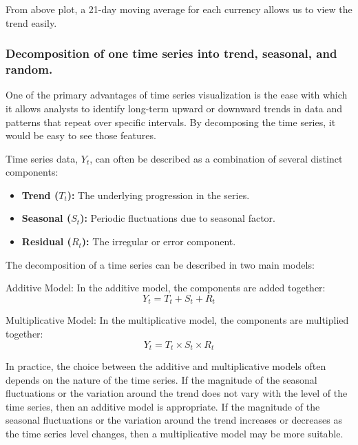 \documentclass{article}\usepackage[]{graphicx}\usepackage[]{xcolor}
\begin{document}
From above plot, a 21-day moving average for each currency allows us to view the trend easily.

\subsubsection{Decomposition of one time series into trend, seasonal, and random.}

One of the primary advantages of time series visualization is the ease with which it allows analysts to identify long-term upward or downward trends in data and patterns that repeat over specific intervals. By decomposing the time series, it would be easy to see those features.

Time series data, $Y_t$, can often be described as a combination of several distinct components:
\begin{itemize}
    \item \textbf{Trend ($T_t$):} The underlying progression in the series.
    \item \textbf{Seasonal ($S_t$):} Periodic fluctuations due to seasonal factor.
    \item \textbf{Residual ($R_t$):} The irregular or error component.
\end{itemize}

The decomposition of a time series can be described in two main models:

Additive Model:
In the additive model, the components are added together:
\[
Y_t = T_t + S_t + R_t
\]

Multiplicative Model:
In the multiplicative model, the components are multiplied together:
\[
Y_t = T_t \times S_t \times R_t
\]

In practice, the choice between the additive and multiplicative models often depends on the nature of the time series. If the magnitude of the seasonal fluctuations or the variation around the trend does not vary with the level of the time series, then an additive model is appropriate. If the magnitude of the seasonal fluctuations or the variation around the trend increases or decreases as the time series level changes, then a multiplicative model may be more suitable.
\end{document}
